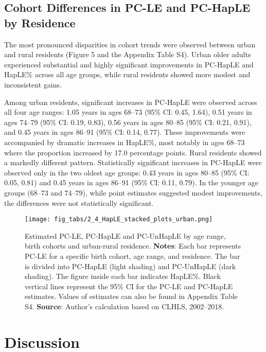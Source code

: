 \documentclass[12pt, a4paper]{article}
\begin{document}
\subsection{Cohort Differences in PC-LE and PC-HapLE by Residence}

The most pronounced disparities in cohort trends were observed between urban and rural residents (Figure 5 and the Appendix Table S4). Urban older adults experienced substantial and highly significant improvements in PC-HapLE and HapLE\% across all age groups, while rural residents showed more modest and inconsistent gains.

Among urban residents, significant increases in PC-HapLE were observed across all four age ranges: 1.05 years in ages 68–73 (95\% CI: 0.45, 1.64), 0.51 years in ages 74–79 (95\% CI: 0.19, 0.83), 0.56 years in ages 80–85 (95\% CI: 0.21, 0.91), and 0.45 years in ages 86–91 (95\% CI: 0.14, 0.77). These improvements were accompanied by dramatic increases in HapLE\%, most notably in ages 68–73 where the proportion increased by 17.0 percentage points. Rural residents showed a markedly different pattern. Statistically significant increases in PC-HapLE were observed only in the two oldest age groups: 0.43 years in ages 80–85 (95\% CI: 0.05, 0.81) and 0.45 years in ages 86–91 (95\% CI: 0.11, 0.79). In the younger age groups (68–73 and 74–79), while point estimates suggested modest improvements, the differences were not statistically significant.

\begin{figure}[!p]
  \centering
  \texttt{[image: fig\_tabs/2\_4\_HapLE\_stacked\_plots\_urban.png]}
  \caption{Estimated PC-LE, PC-HapLE and PC-UnHapLE by age range, birth cohorts and urban-rural residence. \textbf{Notes}: Each bar represents PC-LE for a specific birth cohort, age range, and residence. The bar is divided into PC-HapLE (light shading) and PC-UnHapLE (dark shading). The figure inside each bar indicates HapLE\%. Black vertical lines represent the 95\% CI for the PC-LE and PC-HapLE estimates. Values of estimates can also be found in Appendix Table S4. \textbf{Source}: Author's calculation based on CLHLS, 2002–2018.}
\end{figure}

\section{Discussion}
\end{document}

